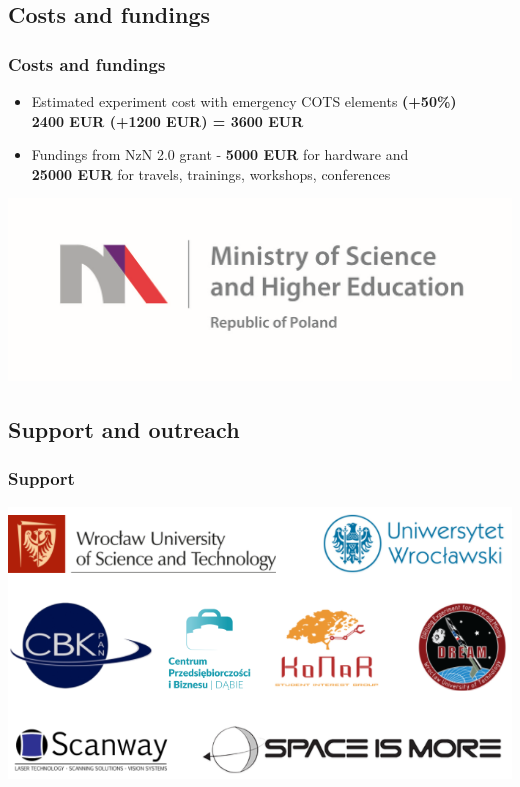 \documentclass[xcolor=dvipsnames]{beamer}%
\begin{document}
\subsection{Costs and fundings}
\begin{frame} %
\frametitle{Costs and fundings}
  \begin{itemize}
    \item Estimated experiment cost with emergency COTS elements \textbf{(+50\%)} \\
    \centering
    \textbf{2400 EUR (+1200 EUR) = 3600 EUR} 
    	\pause
        \vspace{1cm}
    \item Fundings from NzN 2.0 grant - \textbf{5000 EUR} for hardware and\\ \textbf{25000 EUR} for travels, trainings, workshops, conferences 
  \end{itemize}
  
 	\centering	
    \includegraphics{figure/mnisw.png}
\end{frame}



\subsection{Support and outreach}
\begin{frame}
\frametitle{Support}
\includegraphics[width=\textwidth]{figure/tracz_sponsorzy.png}
\end{frame}
\end{document}
